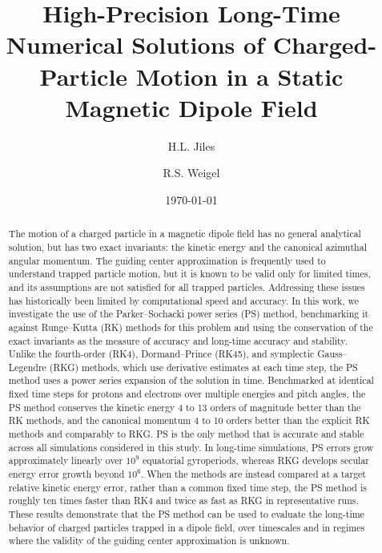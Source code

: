 \documentclass{article}
\title{High-Precision Long-Time Numerical Solutions of Charged-Particle Motion in a Static Magnetic Dipole Field}
\author{H.L. Jiles}
\author{R.S. Weigel}
\affil{Space Weather Lab\\Department of Physics and Astronomy\\George Mason University}
\date{\today}
\begin{document}
\maketitle

\linenumbers %
\captionsetup[subfigure]{font=footnotesize}
\begin{abstract}
The motion of a charged particle in a magnetic dipole field has no general analytical solution, but has two exact invariants: the kinetic energy and the canonical azimuthal angular momentum. 
The guiding center approximation is frequently used to understand trapped particle motion, but it is known to be valid only for limited times, and its assumptions are not satisfied for all trapped particles. Addressing these issues has historically been limited by computational speed and accuracy.
In this work, we investigate the use of the Parker--Sochacki power series (PS) method, benchmarking it against Runge--Kutta (RK) methods for this problem and using the conservation of the exact invariants as the measure of accuracy and long-time accuracy and stability. Unlike the fourth-order (RK4), Dormand--Prince (RK45), and symplectic Gauss--Legendre (RKG) methods, which use derivative estimates at each time step, the PS method uses a power series expansion of the solution in time. Benchmarked at identical fixed time steps for protons and electrons over multiple energies and pitch angles, the PS method conserves the kinetic energy 4 to 13 orders of magnitude better than the RK methods, and the canonical momentum 4 to 10 orders better than the explicit RK methods and comparably to RKG. PS is the only method that is accurate and stable across all simulations considered in this study. In long-time simulations, PS errors grow approximately linearly over $10^9$ equatorial gyroperiods, whereas RKG develops secular energy error growth beyond $10^6$. When the methods are instead compared at a target relative kinetic energy error, rather than a common fixed time step, the PS method is roughly ten times faster than RK4 and twice as fast as RKG in representative runs. These results demonstrate that the PS method can be used to evaluate the long-time behavior of charged particles trapped in a dipole field, over timescales and in regimes where the validity of the guiding center approximation is unknown.
\end{abstract}
\end{document}

